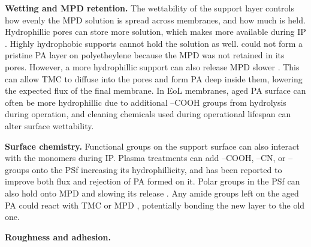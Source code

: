 \textbf{Wetting and MPD retention.}
The wettability of the support layer controls how evenly the MPD solution is spread across membranes, and how much is held. Hydrophillic pores can store more solution, which makes more available during IP \citep{Huang2022}. Highly hydrophobic supports cannot hold the solution as well. \citet{Huang2022} could not form a pristine PA layer on polyetheylene because the MPD was not retained in its pores. However, a more hydrophillic support can also release MPD slower \citep{GhoshHoek2009}. This can allow TMC to diffuse into the pores and form PA deep inside them, lowering the expected flux of the final membrane. In EoL membranes, aged PA surface can often be more hydrophillic due to additional --COOH groups from hydrolysis during operation, and cleaning chemicals used during operational lifespan can alter surface wettability. 

\textbf{Surface chemistry.}
Functional groups on the support surface can also interact with the monomers during IP. Plasma treatments can add --COOH, --CN, or -- groups onto the PSf increasing its hydrophillicity, and has been reported to improve both flux and rejection of PA formed on it. Polar groups in the PSf can also hold onto MPD and slowing its release \citep{GhoshHoek2009}. Any amide groups left on the aged PA could react with TMC or MPD \citep{Farahbakhsh2024}, potentially bonding the new layer to the old one.

\textbf{Roughness and adhesion.}


